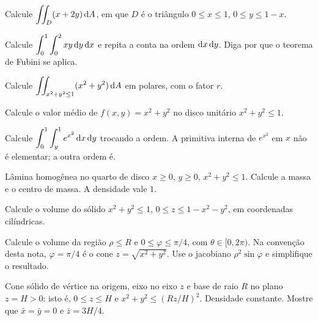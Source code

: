 \documentclass[11pt,a4paper]{article}
\begin{document}
\begin{exercicio}
Calcule $\displaystyle\iint_D (x+2y)\,\mathrm{d} A$, em que $D$ é o triângulo $0\le x\le 1$, $0\le y\le 1-x$.
\end{exercicio}

\begin{exercicio}
Calcule $\displaystyle\int_0^1\int_0^2 xy\,\mathrm{d} y\,\mathrm{d} x$ e repita a conta na ordem $\mathrm{d} x\,\mathrm{d} y$. Diga por que o teorema de Fubini se aplica.
\end{exercicio}

\begin{exercicio}
Calcule $\displaystyle\iint_{x^2+y^2\le 1}(x^2+y^2)\,\mathrm{d} A$ em polares, com o fator $r$.
\end{exercicio}

\begin{exercicio}
Calcule o valor médio de $f(x,y)=x^2+y^2$ no disco unitário $x^2+y^2\le 1$.
\end{exercicio}

\begin{exercicio}
Calcule $\displaystyle\int_0^1\int_y^1 e^{x^2}\,\mathrm{d} x\,\mathrm{d} y$ trocando a ordem. A primitiva interna de $e^{x^2}$ em $x$ não é elementar; a outra ordem é.
\end{exercicio}

\begin{exercicio}
Lâmina homogênea no quarto de disco $x\ge 0$, $y\ge 0$, $x^2+y^2\le 1$. Calcule a massa e o centro de massa. A densidade vale $1$.
\end{exercicio}

\begin{exercicio}
Calcule o volume do sólido $x^2+y^2\le 1$, $0\le z\le 1-x^2-y^2$, em coordenadas cilíndricas.
\end{exercicio}

\begin{exercicio}
Calcule o volume da região $\rho\le R$ e $0\le\varphi\le\pi/4$, com $\theta\in[0,2\pi)$. Na convenção desta nota, $\varphi=\pi/4$ é o cone $z=\sqrt{x^2+y^2}$. Use o jacobiano $\rho^2\sin\varphi$ e simplifique o resultado.
\end{exercicio}

\begin{exercicio}
Cone sólido de vértice na origem, eixo no eixo $z$ e base de raio $R$ no plano $z=H>0$: isto é, $0\le z\le H$ e $x^2+y^2\le (Rz/H)^2$. Densidade constante. Mostre que $\bar x=\bar y=0$ e $\bar z=3H/4$.
\end{exercicio}
\end{document}
